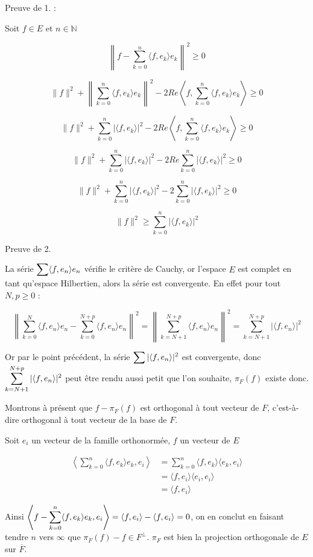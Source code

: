 	\begin{myproof}
		Preuve de 1. :
		
		Soit $f \in E$ et $n \in \mathbb{N}$
		
		$$\left\| f - \sum_{k = 0}^{n} \langle f, e_k \rangle e_k \right\|^2 \geqslant 0$$
		
		$$\|f\|^2 + \left\| \sum_{k = 0}^{n} \langle f, e_k\rangle e_k \right\|^2 - 2 Re \left \langle f , \sum_{k = 0}^{n} \langle f, e_k \rangle e_k \right\rangle \geqslant 0$$
		
		$$\|f\|^2 + \sum_{k = 0}^{n} | \langle f, e_k\rangle | ^2 - 2 Re \left \langle f , \sum_{k = 0}^{n} \langle f, e_k \rangle e_k \right\rangle \geqslant 0$$
		
		$$\|f\|^2 + \sum_{k = 0}^{n} | \langle f, e_k\rangle | ^2 - 2 Re \sum_{k = 0}^{n} |\langle f , e_k \rangle |^2 \geqslant 0$$
		
		$$\|f\|^2 + \sum_{k = 0}^{n} | \langle f, e_k\rangle | ^2 - 2 \sum_{k = 0}^{n} |\langle f , e_k \rangle |^2 \geqslant 0$$
		
		$$\|f\|^2 \geqslant \sum_{k = 0}^{n} |\langle f , e_k \rangle |^2$$
		
		Preuve de 2.
		
		La série $\displaystyle \sum \langle f, e_n \rangle e_n$ vérifie le critère de Cauchy, or l'espace $E$ est complet en tant qu'espace Hilbertien, alors la série est convergente. En effet pour tout $N, p \geqslant 0$ :
		
		$$\left\|\sum_{k = 0}^{N} \langle f, e_n \rangle e_n - \sum_{k = 0}^{N + p} \langle f , e_n \rangle e_n\right\|^2 = \left\| \sum_{k = N+1}^{N + p} \langle f , e_n \rangle e_n \right\|^2 = \sum_{k = N+1}^{N + p} |\langle f , e_n \rangle|^2$$
		
		Or par le point précédent, la série $\displaystyle \sum | \langle f, e_n \rangle|^2$ est convergente, donc  $\displaystyle \sum_{k = N+1}^{N + p} |\langle f , e_n \rangle|^2$ peut être rendu aussi petit que l'on souhaite, $\pi_F(f)$ existe donc.
		
		Montrons à présent que $f - \pi_F(f)$ est orthogonal à tout vecteur de $F$, c'est-à-dire orthogonal à tout vecteur de la base de $F$.
		
		Soit $e_i$ un vecteur de la famille orthonormée, $f$ un vecteur de $E$
		
		$$
		\begin{aligned}
			\left \langle \sum_{k=0}^n \langle f, e_k \rangle e_k, e_i \right \rangle &= \sum_{k=0}^{n} \langle f, e_k \rangle \langle e_k, e_i \rangle \\
			&= \langle f, e_i \rangle \langle e_i, e_i \rangle \\
			&= \langle f, e_i \rangle
		\end{aligned}
		$$

		Ainsi $\displaystyle \left\langle f - \sum_{k = 0}^n \langle f, e_k \rangle e_k, e_i \right \rangle = \langle f, e_i \rangle - \langle f, e_i \rangle = 0$, on en conclut en faisant tendre $n$ vers $\infty$ que $\pi_F(f) - f \in F^\bot$. $\pi_F$ est bien la projection orthogonale de $E$ sur $\overline{F}$.
		
		\cqfd
	\end{myproof}
	
